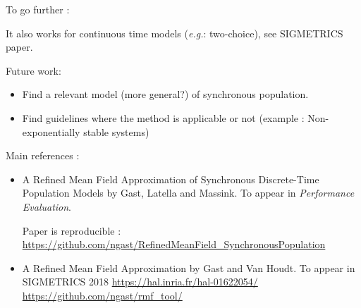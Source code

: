 \documentclass{beamer}
\newcommand\blue[1]{{\color{blue}#1}}
\begin{document}
\begin{frame}{To go further : }
  
  It also works for continuous time models (\emph{e.g.}: two-choice),
  see SIGMETRICS paper. \bigskip

  Future work:
  \begin{itemize}
  \item Find a relevant model (more general?) of synchronous
    population.
  \item Find guidelines where the method is applicable or not (example
    : Non-exponentially stable systems)
  \end{itemize}
  
  \bigskip
  
  Main references :
  \begin{itemize}
  \item \blue{A Refined Mean Field Approximation of Synchronous
      Discrete-Time Population Models} by Gast, Latella and
    Massink. To appear in \emph{Performance Evaluation}.
    
    Paper is reproducible :
    \url{https://github.com/ngast/RefinedMeanField_SynchronousPopulation}
  \item \blue{A Refined Mean Field Approximation} by Gast and Van
    Houdt. To appear in SIGMETRICS 2018 {\small
      \url{https://hal.inria.fr/hal-01622054/}}
    \url{https://github.com/ngast/rmf_tool/}
  \end{itemize}
\end{frame}
\end{document}
